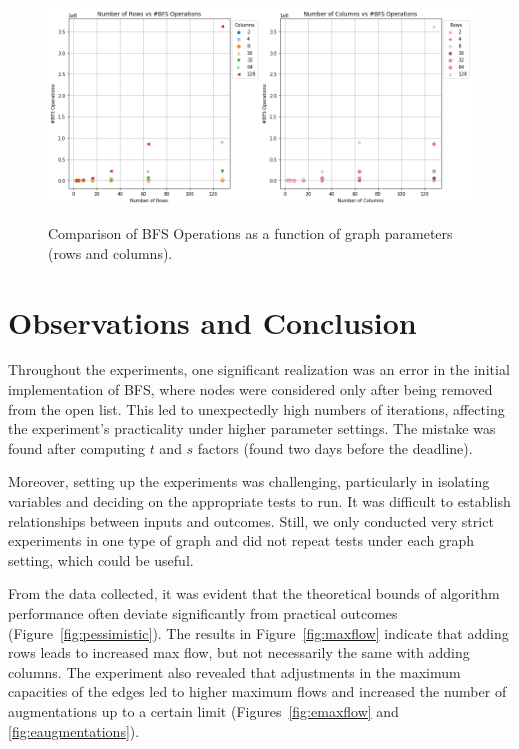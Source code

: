 \documentclass{article}
\begin{document}
\begin{figure}[H]
\centering
  \centering
  \includegraphics[width=1.0\linewidth]{bfs_operations.png}
  \label{fig:bfs_operations}
  \caption{Comparison of BFS Operations as a function of graph parameters (rows and columns).}
\end{figure}

\section{Observations and Conclusion}

Throughout the experiments, one significant realization was an error in the initial implementation of BFS, where nodes were considered only after being removed from the open list. This led to unexpectedly high numbers of iterations, affecting the experiment's practicality under higher parameter settings.  The mistake was found after computing \(t\) and \(s\) factors (found two days before the deadline).

Moreover, setting up the experiments was challenging, particularly in isolating variables and deciding on the appropriate tests to run. It was difficult to establish relationships between inputs and outcomes. Still, we only conducted very strict experiments in one type of graph and did not repeat tests under each graph setting, which could be useful. 

From the data collected, it was evident that the theoretical bounds of algorithm performance often deviate significantly from practical outcomes (Figure~\ref{fig:pessimistic}). The results in Figure~\ref{fig:maxflow} indicate that adding rows leads to increased max flow, but not necessarily the same with adding columns. The experiment also revealed that adjustments in the maximum capacities of the edges led to higher maximum flows and increased the number of augmentations up to a certain limit (Figures~\ref{fig:emaxflow} and \ref{fig:eaugmentations}).
\end{document}
